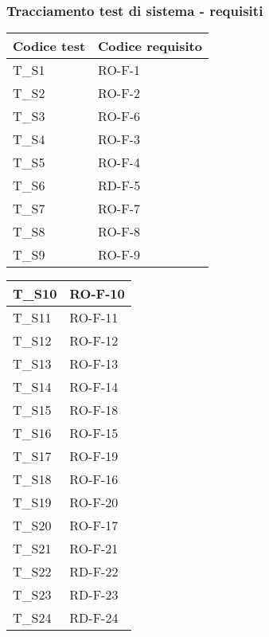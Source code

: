 \subsubsection{Tracciamento test di sistema - requisiti}
\begin{center}
    \renewcommand{\arraystretch}{1.8}
    \begin{tabular}{|m{6em}|m{8em}|}
        \hline
        \textbf{Codice test} & \textbf{Codice requisito}\\
        \hline
        T\_S1 & RO-F-1\\
        \hline
        T\_S2 & RO-F-2\\
        \hline
        T\_S3 & RO-F-6\\
        \hline
        T\_S4 & RO-F-3\\
        \hline
        T\_S5 & RO-F-4\\
        \hline
        T\_S6 & RD-F-5\\
        \hline
        T\_S7 & RO-F-7\\
        \hline
        T\_S8 & RO-F-8\\
        \hline
        T\_S9 & RO-F-9\\
        \hline
    \end{tabular}
    \newpage
    \renewcommand{\arraystretch}{1.8}
    \begin{tabular}{|m{6em}|m{8em}|}
        \hline
        T\_S10 & RO-F-10\\
        \hline
        T\_S11 & RO-F-11\\
        \hline
        T\_S12 & RO-F-12\\
        \hline
        T\_S13 & RO-F-13\\
        \hline
        T\_S14 & RO-F-14\\
        \hline
        T\_S15 & RO-F-18\\
        \hline
        T\_S16 & RO-F-15\\
        \hline
        T\_S17 & RO-F-19\\
        \hline
        T\_S18 & RO-F-16\\
        \hline
        T\_S19 & RO-F-20\\
        \hline
        T\_S20 & RO-F-17\\
        \hline
        T\_S21 & RO-F-21\\
        \hline
        T\_S22 & RD-F-22\\
        \hline
        T\_S23 & RD-F-23\\
        \hline
        T\_S24 & RD-F-24\\

\end{tabular}
\end{center}
